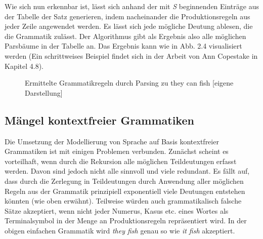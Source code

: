 \documentclass[12pt]{report}
\begin{document}
Wie sich nun erkennbar ist, lässt sich anhand der mit \textit{S} beginnenden Einträge aus der Tabelle der Satz generieren, indem nacheinander die Produktionsregeln aus jeder Zeile angewendet werden. Es lässt sich jede mögliche Deutung ablesen, die die Grammatik zulässt. Der Algorithmus gibt als Ergebnis also alle möglichen Parsbäume in der Tabelle an. Das Ergebnis kann wie in Abb. 2.4 visualisiert werden (Ein schrittweises Beispiel findet sich in der Arbeit von Ann Copestake \cite{cop04} in Kapitel 4.8).
\begin{figure}[h!]
\begin{center}
\caption{Ermittelte Grammatikregeln durch Parsing zu \glqq  they can fish\grqq{} [eigene Darstellung]}
\end{center}
\end{figure}

\subsection{Mängel kontextfreier Grammatiken}
Die Umsetzung der Modellierung von Sprache auf Basis kontextfreier Grammatiken ist mit einigen Problemen verbunden. Zunächst scheint es vorteilhaft, wenn durch die Rekursion alle möglichen Teildeutungen erfasst werden. Davon sind jedoch nicht alle sinnvoll und viele redundant. Es fällt auf, dass durch die Zerlegung in Teildeutungen durch Anwendung aller möglichen Regeln aus der Grammatik prinzipiell exponentiell viele Deutungen entstehen könnten (wie oben erwähnt). Teilweise würden auch grammatikalisch falsche Sätze akzeptiert, wenn nicht jeder Numerus, Kasus etc. eines Wortes als Terminalsymbol in der Menge an Produktionsregeln repräsentiert wird. In der obigen einfachen Grammatik wird \textit{\glqq  they fish\grqq{}} genau so wie \textit{\glqq  it fish\grqq{}} akzeptiert. 
\end{document}
